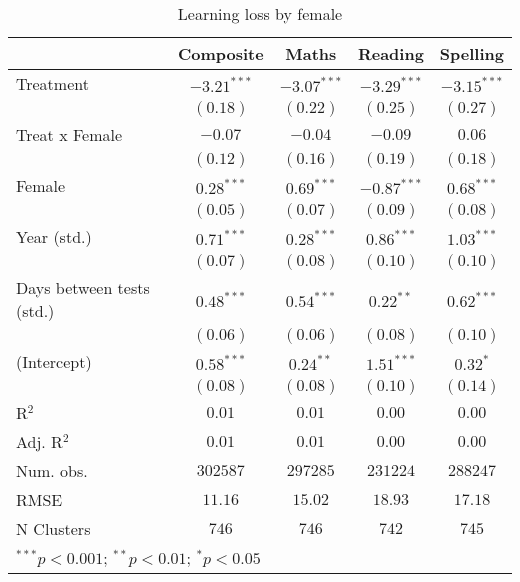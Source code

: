 
\begin{table}
\begin{center}
\begin{tabular}{l c c c c}
\hline
 & Composite & Maths & Reading & Spelling \\
\hline
Treatment                 & $-3.21^{***}$ & $-3.07^{***}$ & $-3.29^{***}$ & $-3.15^{***}$ \\
                          & $(0.18)$      & $(0.22)$      & $(0.25)$      & $(0.27)$      \\
Treat x Female            & $-0.07$       & $-0.04$       & $-0.09$       & $0.06$        \\
                          & $(0.12)$      & $(0.16)$      & $(0.19)$      & $(0.18)$      \\
Female                    & $0.28^{***}$  & $0.69^{***}$  & $-0.87^{***}$ & $0.68^{***}$  \\
                          & $(0.05)$      & $(0.07)$      & $(0.09)$      & $(0.08)$      \\
Year (std.)               & $0.71^{***}$  & $0.28^{***}$  & $0.86^{***}$  & $1.03^{***}$  \\
                          & $(0.07)$      & $(0.08)$      & $(0.10)$      & $(0.10)$      \\
Days between tests (std.) & $0.48^{***}$  & $0.54^{***}$  & $0.22^{**}$   & $0.62^{***}$  \\
                          & $(0.06)$      & $(0.06)$      & $(0.08)$      & $(0.10)$      \\
(Intercept)               & $0.58^{***}$  & $0.24^{**}$   & $1.51^{***}$  & $0.32^{*}$    \\
                          & $(0.08)$      & $(0.08)$      & $(0.10)$      & $(0.14)$      \\
\hline
R$^2$                     & $0.01$        & $0.01$        & $0.00$        & $0.00$        \\
Adj. R$^2$                & $0.01$        & $0.01$        & $0.00$        & $0.00$        \\
Num. obs.                 & $302587$      & $297285$      & $231224$      & $288247$      \\
RMSE                      & $11.16$       & $15.02$       & $18.93$       & $17.18$       \\
N Clusters                & $746$         & $746$         & $742$         & $745$         \\
\hline
\multicolumn{5}{l}{\scriptsize{$^{***}p<0.001$; $^{**}p<0.01$; $^{*}p<0.05$}}
\end{tabular}
\caption{Learning loss by female}
\label{tablefemale}
\end{center}
\end{table}
